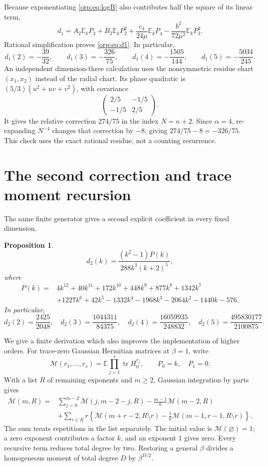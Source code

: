 \documentclass[11pt]{article}
\newtheorem{proposition}[theorem]{Proposition}
\theoremstyle{remark}\newtheorem{remark}[theorem]{Remark}
\newcommand{\E}{\mathbb E}
\newcommand{\tr}{\operatorname{tr}}
\begin{document}
Because exponentiating \eqref{orp:eq:logB} also contributes half the square of its linear term,
\begin{equation}\label{orp:eq:d1mom}
 d_1=A_2\E_kP_2+B_2\E_kP_2^2+\frac{c_4}{24\mu}\E_kP_4
       -\frac{b^2}{72\mu^2}\E_kP_3^2.
\end{equation}
Rational simplification proves \eqref{orp:eq:d1}. In particular,
\[
 d_1(2)=-\frac{39}{32},\qquad d_1(3)=-\frac{326}{75},\qquad
 d_1(4)=-\frac{1505}{144},\qquad d_1(5)=-\frac{5034}{245}.
\]
An independent dimension-three calculation uses the nonsymmetric residue chart $(x_1,x_2)$ instead of the radial chart. Its phase quadratic is $(5/3)(u^2+uv+v^2)$, with covariance
\[
 \begin{pmatrix}2/5&-1/5\\-1/5&2/5\end{pmatrix}.
\]
It gives the relative correction $274/75$ in the index $N=n+2$. Since $\alpha=4$, re-expanding $N^{-4}$ changes that correction by $-8$, giving $274/75-8=-326/75$. This check uses the exact rational residue, not a counting recurrence.

\section{The second correction and trace moment recursion}\label{orp:sec:second}
The same finite generator gives a second explicit coefficient in every fixed dimension.
\begin{proposition}\label{orp:prop:d2}
\begin{equation}\label{orp:eq:d2}
 d_2(k)=\frac{(k^2-1)P(k)}{288k^3(k+2)^5},
\end{equation}
where
\begin{align*}
 P(k)={}&4k^{12}+40k^{11}+172k^{10}+448k^9+877k^8+1342k^7\\
       &+1227k^6+42k^5-1332k^4-1968k^3-2064k^2-1440k-576.
\end{align*}
In particular,
\[
 d_2(2)=\frac{2425}{2048},\quad d_2(3)=\frac{1044311}{84375},\quad
 d_2(4)=\frac{16059935}{248832},\quad d_2(5)=\frac{495830177}{2100875}.
\]
\end{proposition}
We give a finite derivation which also improves the implementation of higher orders. For trace-zero Gaussian Hermitian matrices at $\beta=1$, write
\[
 \mathcal M(r_1,\ldots,r_s)=\E\prod_{j=1}^s\tr H_0^{r_j},
 \qquad P_0=k,\quad P_1=0.
\]
With a list $R$ of remaining exponents and $m\ge2$, Gaussian integration by parts gives
\begin{align}
 \mathcal M(m,R)={}&\sum_{j=0}^{m-2}\mathcal M(j,m-2-j,R)
        -\frac{m-1}{k}\mathcal M(m-2,R)\nonumber\\
 &+\sum_{r\in R}r\left\{\mathcal M(m+r-2,R\setminus r)
       -\frac1k\mathcal M(m-1,r-1,R\setminus r)\right\}.\label{orp:eq:IBP}
\end{align}
The sum treats repetitions in the list separately. The initial value is $\mathcal M(\varnothing)=1$; a zero exponent contributes a factor $k$, and an exponent $1$ gives zero. Every recursive term reduces total degree by two. Restoring a general $\beta$ divides a homogeneous moment of total degree $D$ by $\beta^{D/2}$.
\end{document}
